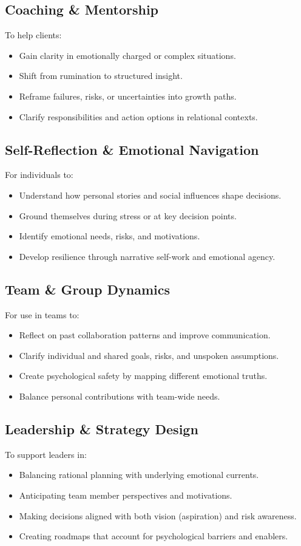 \documentclass{article}
\begin{document}
\subsection{Coaching \& Mentorship}
To help clients:
\begin{itemize}[noitemsep,topsep=0pt]
    \item Gain clarity in emotionally charged or complex situations.
    \item Shift from rumination to structured insight.
    \item Reframe failures, risks, or uncertainties into growth paths.
    \item Clarify responsibilities and action options in relational contexts.
\end{itemize}

\subsection{Self-Reflection \& Emotional Navigation}
For individuals to:
\begin{itemize}[noitemsep,topsep=0pt]
    \item Understand how personal stories and social influences shape decisions.
    \item Ground themselves during stress or at key decision points.
    \item Identify emotional needs, risks, and motivations.
    \item Develop resilience through narrative self-work and emotional agency.
\end{itemize}

\subsection{Team \& Group Dynamics}
For use in teams to:
\begin{itemize}[noitemsep,topsep=0pt]
    \item Reflect on past collaboration patterns and improve communication.
    \item Clarify individual and shared goals, risks, and unspoken assumptions.
    \item Create psychological safety by mapping different emotional truths.
    \item Balance personal contributions with team-wide needs.
\end{itemize}

\subsection{Leadership \& Strategy Design}
To support leaders in:
\begin{itemize}[noitemsep,topsep=0pt]
    \item Balancing rational planning with underlying emotional currents.
    \item Anticipating team member perspectives and motivations.
    \item Making decisions aligned with both vision (aspiration) and risk awareness.
    \item Creating roadmaps that account for psychological barriers and enablers.
\end{itemize}
\end{document}

